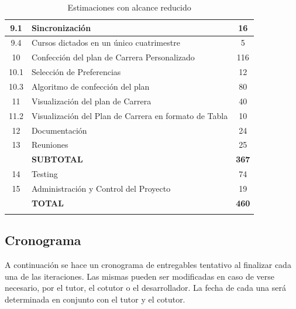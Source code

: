 \documentclass[a4paper]{article}
\begin{document}
\begin{longtable}{| c | l | c |}
\hline
9.1					&	Sincronización													&	16\\
\hline
9.4					&	Cursos dictados en un único cuatrimestre						&	5\\
\hline
10					&	Confección del plan de Carrera Personalizado					&	116\\
\hline
10.1				&	Selección de Preferencias										&	12\\
\hline
10.3				&	Algoritmo de confección del plan								&	80\\
\hline
11					&	Visualización del plan de Carrera								&	40\\
\hline
11.2				&	Visualización del Plan de Carrera en formato de Tabla			&	10\\
\hline
12					&	Documentación													&	24\\
\hline
13					&	Reuniones														&	25\\
\hline
					&	\textbf{SUBTOTAL}												&	\textbf{367}\\
\hline
14					&	Testing															&	74\\
\hline
15					&	Administración y Control del Proyecto							&	19\\
\hline
					&	\textbf{TOTAL}													&	\textbf{460}\\
\hline
\caption{Estimaciones con alcance reducido}
\end{longtable}

\newpage

\subsection{Cronograma}

A continuación se hace un cronograma de entregables tentativo al finalizar cada una de las iteraciones. Las mismas pueden ser modificadas en caso de verse necesario, por el tutor, el cotutor o el desarrollador. La fecha de cada una será determinada en conjunto con el tutor y el cotutor.
\end{document}
